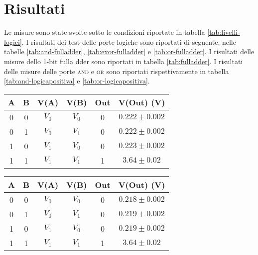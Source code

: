 \section{Risultati}\label{sec:risultati}
Le misure sono state svolte sotto le condizioni riportate in tabella \ref{tab:livelli-logici}.
I risultati dei test delle porte logiche sono riportati di seguente, nelle tabelle \ref{tab:and-fulladder}, \ref{tab:exor-fulladder} e \ref{tab:or-fulladder}.
I risultati delle misure dello 1-bit fulla dder sono riportati in tabella \ref{tab:fulladder}.
I risultati delle misure delle porte \textsc{and} e \textsc{or} sono riportati rispettivamente in tabella \ref{tab:and-logicapositiva} e \ref{tab:or-logicapositiva}.

\begin{table}[H]
  \centering
  \begin{subtable}[H]{0.5\textwidth}
    \centering
    \begin{tabular}[t]{c  c | c  c | c  c}
      \hline
      A & B & V(A) & V(B) & Out & V(Out) (V)\\
      \hline
      0 & 0 & $V_{0}$ & $V_{0}$ & 0 & $0.222 \pm 0.002$ \\
      0 & 1 & $V_{0}$ & $V_{1}$ & 0 & $0.222 \pm 0.002$ \\
      1 & 0 & $V_{1}$ & $V_{0}$ & 0 & $0.223 \pm 0.002$ \\
      1 & 1 & $V_{1}$ & $V_{1}$ & 1 & $3.64 \pm 0.02$ \\
      \hline
    \end{tabular}
  \end{subtable}

  \vspace{.5cm}

  \begin{subtable}[H]{0.5\textwidth}
    \centering
    \begin{tabular}[t]{c  c | c  c | c  c}
      \hline
      A & B & V(A) & V(B) & Out & V(Out) (V)\\
      \hline
      0 & 0 & $V_{0}$ & $V_{0}$ & 0 & $0.218 \pm 0.002$ \\
      0 & 1 & $V_{0}$ & $V_{1}$ & 0 & $0.219 \pm 0.002$ \\
      1 & 0 & $V_{1}$ & $V_{0}$ & 0 & $0.219 \pm 0.002$ \\
      1 & 1 & $V_{1}$ & $V_{1}$ & 1 & $3.64 \pm 0.02$ \\
      \hline
    \end{tabular}
  \end{subtable}


\end{table}
